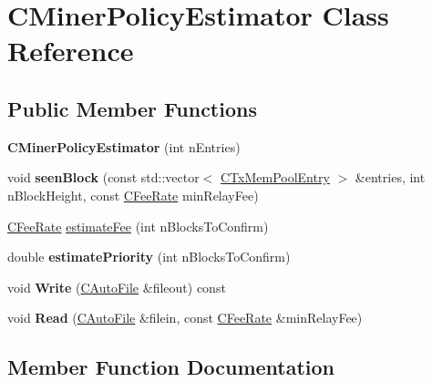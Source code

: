 \hypertarget{class_c_miner_policy_estimator}{}\section{C\+Miner\+Policy\+Estimator Class Reference}
\label{class_c_miner_policy_estimator}
\subsection*{Public Member Functions}
\begin{DoxyCompactItemize}
\item 
\mbox{\label{class_c_miner_policy_estimator_a13e8fe709d07a3e6b1bf31fbc128a998}} 
{\bfseries C\+Miner\+Policy\+Estimator} (int n\+Entries)
\item 
\mbox{\label{class_c_miner_policy_estimator_a2b30e1eaa7eec2744c576fba5bd1a168}} 
void {\bfseries seen\+Block} (const std\+::vector$<$ \mbox{\hyperlink{class_c_tx_mem_pool_entry}{C\+Tx\+Mem\+Pool\+Entry}} $>$ \&entries, int n\+Block\+Height, const \mbox{\hyperlink{class_c_fee_rate}{C\+Fee\+Rate}} min\+Relay\+Fee)
\item 
\mbox{\hyperlink{class_c_fee_rate}{C\+Fee\+Rate}} \mbox{\hyperlink{class_c_miner_policy_estimator_a00b6f58a508ee87999910972f37b3281}{estimate\+Fee}} (int n\+Blocks\+To\+Confirm)
\item 
\mbox{\label{class_c_miner_policy_estimator_ae9bb4813622680e6e3b48ea8c0ce41b6}} 
double {\bfseries estimate\+Priority} (int n\+Blocks\+To\+Confirm)
\item 
\mbox{\label{class_c_miner_policy_estimator_a431733d4c161afb6cef2c7a3f4fec99f}} 
void {\bfseries Write} (\mbox{\hyperlink{class_c_auto_file}{C\+Auto\+File}} \&fileout) const
\item 
\mbox{\label{class_c_miner_policy_estimator_a86e709bc44e9f6f597519173f15595ff}} 
void {\bfseries Read} (\mbox{\hyperlink{class_c_auto_file}{C\+Auto\+File}} \&filein, const \mbox{\hyperlink{class_c_fee_rate}{C\+Fee\+Rate}} \&min\+Relay\+Fee)
\end{DoxyCompactItemize}


\subsection{Member Function Documentation}
\mbox{\label{class_c_miner_policy_estimator_a00b6f58a508ee87999910972f37b3281}} 
